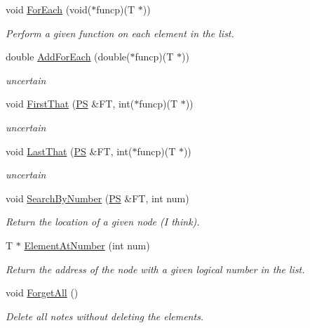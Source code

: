 \begin{DoxyCompactItemize}
void \hyperlink{classlink_list_aa6f33a7774747239eff96ae4c55b4b68}{ForEach} (void($\ast$funcp)(T $\ast$))
\begin{DoxyCompactList}\small\item\em Perform a given function on each element in the list. \item\end{DoxyCompactList}\item 
double \hyperlink{classlink_list_a8e4653b41b17f8b5be54c8875740fd03}{AddForEach} (double($\ast$funcp)(T $\ast$))
\begin{DoxyCompactList}\small\item\em uncertain \item\end{DoxyCompactList}\item 
void \hyperlink{classlink_list_ad83267f2c76e7bda04cdd0dd340d9b4f}{FirstThat} (\hyperlink{structlink_list_1_1_snode}{PS} \&FT, int($\ast$funcp)(T $\ast$))
\begin{DoxyCompactList}\small\item\em uncertain \item\end{DoxyCompactList}\item 
void \hyperlink{classlink_list_a297739d8d57857ea4e689ab3d41a10a3}{LastThat} (\hyperlink{structlink_list_1_1_snode}{PS} \&FT, int($\ast$funcp)(T $\ast$))
\begin{DoxyCompactList}\small\item\em uncertain \item\end{DoxyCompactList}\item 
void \hyperlink{classlink_list_aa954023a6cb312bec80507a3191cc367}{SearchByNumber} (\hyperlink{structlink_list_1_1_snode}{PS} \&FT, int num)
\begin{DoxyCompactList}\small\item\em Return the location of a given node (I think). \item\end{DoxyCompactList}\item 
T $\ast$ \hyperlink{classlink_list_a5735a6e54a2eed841bdf1fdb52aed03f}{ElementAtNumber} (int num)
\begin{DoxyCompactList}\small\item\em Return the address of the node with a given logical number in the list. \item\end{DoxyCompactList}\item 
void \hyperlink{classlink_list_a8005163404c8378ebb3b34d0e21da338}{ForgetAll} ()
\begin{DoxyCompactList}\small\item\em Delete all notes without deleting the elements. \item\end{DoxyCompactList}\end{DoxyCompactItemize}
